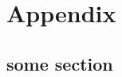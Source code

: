 

\chapter{Appendix} %
\label{Append}
\section *{}

\ifpdf
    \graphicspath{{backmatter/fig/PNG/}{backmatter/fig/PDF/}{backmatter/fig/}}
\else
    \graphicspath{{backmatter/fig/EPS/}{backmatter/fig/}}
\fi

\section*{some section}





